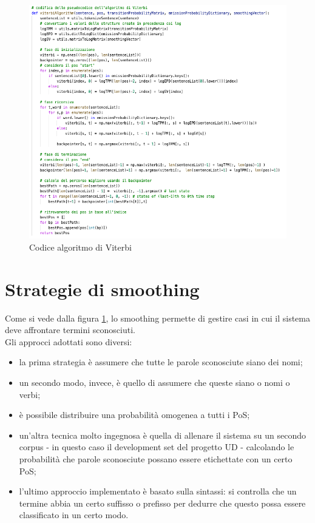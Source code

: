 \documentclass[12pt]{article}
\begin{document}
\begin{figure}[H]
   \centering
   \includegraphics[scale=0.5]{fig/ViterbiCodice.png}
   \caption{Codice algoritmo di Viterbi}\label{fig:Viterbi}
\end{figure}
\section{Strategie di smoothing}
Come si vede dalla figura \ref{fig:Viterbi}, lo smoothing permette di gestire casi in cui il sistema deve affrontare termini sconosciuti. 
\\Gli approcci adottati sono diversi:
\begin{itemize}
    \item la prima strategia è assumere che tutte le parole sconosciute siano dei nomi;
    \item un secondo modo, invece, è quello di assumere che queste siano o nomi o verbi;
    \item è possibile distribuire una probabilità omogenea a tutti i PoS;
    \item un’altra tecnica molto ingegnosa è quella di allenare il sistema su un secondo corpus - in questo caso il development set del progetto UD - calcolando le probabilità che parole sconosciute possano essere etichettate con un certo PoS;
    \item l’ultimo approccio implementato è basato sulla sintassi: si controlla che un termine abbia un certo suffisso o prefisso per dedurre che questo possa essere classificato in un certo modo.
\end{itemize} 
\end{document}
